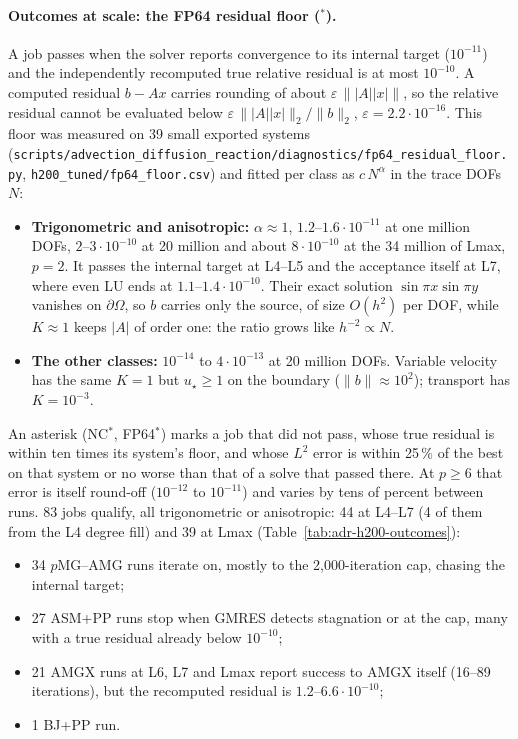 \paragraph{Outcomes at scale: the FP64 residual floor ($^*$).}
\label{par:adr-h200-fp64}
A job passes when the solver reports convergence to its internal target ($10^{-11}$) and the
independently recomputed true relative residual is at most $10^{-10}$. A computed residual
$b-Ax$ carries rounding of about $\varepsilon\,\||A||x|\|$, so the relative residual cannot be
evaluated below $\varepsilon\,\||A||x|\|_2/\|b\|_2$, $\varepsilon=2.2\cdot10^{-16}$. This floor was
measured on 39 small exported systems
(\nolinkurl{scripts/advection_diffusion_reaction/diagnostics/fp64_residual_floor.py},
\nolinkurl{h200_tuned/fp64_floor.csv}) and fitted per class as $c\,N^\alpha$ in the trace DOFs $N$:
\begin{itemize}
\item \textbf{Trigonometric and anisotropic:} $\alpha\approx1$, $1.2$--$1.6\cdot10^{-11}$ at one
  million DOFs, $2$--$3\cdot10^{-10}$ at 20 million and about $8\cdot10^{-10}$ at the 34 million
  of Lmax, $p=2$. It passes the internal target at L4--L5 and the acceptance itself at L7, where
  even LU ends at $1.1$--$1.4\cdot10^{-10}$. Their exact
  solution $\sin\pi x\sin\pi y$ vanishes on $\partial\Omega$, so $b$ carries only the source,
  of size $O(h^2)$ per DOF, while $K\approx1$ keeps $|A|$ of order one: the ratio grows like
  $h^{-2}\propto N$.
\item \textbf{The other classes:} $10^{-14}$ to $4\cdot10^{-13}$ at 20 million DOFs. Variable
  velocity has the same $K=1$ but $u_\star\ge1$ on the boundary ($\|b\|\approx10^2$); transport
  has $K=10^{-3}$.
\end{itemize}
An asterisk (NC$^*$, FP64$^*$) marks a job that did not pass, whose true residual is within ten
times its system's floor, and whose $L^2$ error is within 25\,\% of the best on that system or no
worse than that of a solve that passed there. At $p\ge6$ that error is itself round-off
($10^{-12}$ to $10^{-11}$) and varies by tens of percent between runs. 83 jobs qualify, all
trigonometric or anisotropic: 44 at L4--L7 (4 of them from the L4 degree fill) and 39 at Lmax
(Table~\ref{tab:adr-h200-outcomes}):
\begin{itemize}
\item 34 $p$MG--AMG runs iterate on, mostly to the 2{,}000-iteration cap, chasing the internal
  target;
\item 27 ASM+PP runs stop when GMRES detects stagnation or at the cap, many with a true residual
  already below $10^{-10}$;
\item 21 AMGX runs at L6, L7 and Lmax report success to AMGX itself (16--89 iterations), but the
  recomputed residual is $1.2$--$6.6\cdot10^{-10}$;
\item 1 BJ+PP run.
\end{itemize}
